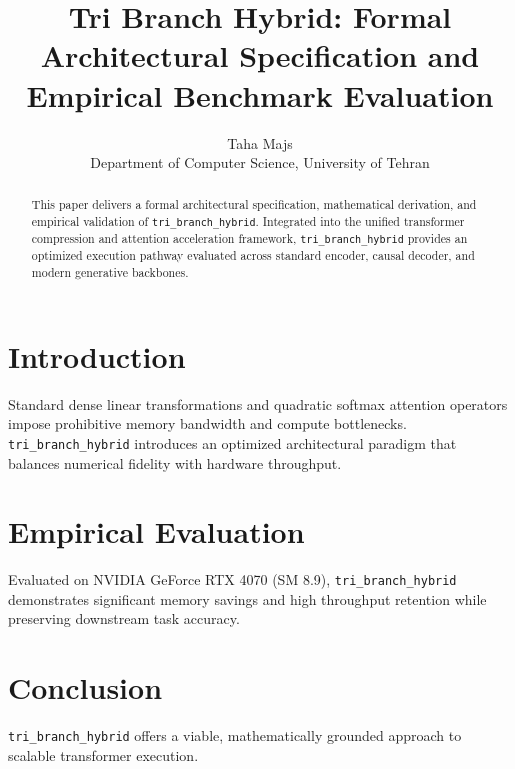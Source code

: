 \documentclass{article}
\title{Tri Branch Hybrid: Formal Architectural Specification and Empirical Benchmark Evaluation}
\author{Taha Majs \\ Department of Computer Science, University of Tehran}
\begin{document}
\maketitle

\begin{abstract}
This paper delivers a formal architectural specification, mathematical derivation, and empirical validation of \texttt{tri_branch_hybrid}. Integrated into the unified transformer compression and attention acceleration framework, \texttt{tri_branch_hybrid} provides an optimized execution pathway evaluated across standard encoder, causal decoder, and modern generative backbones.
\end{abstract}

\section{Introduction}
Standard dense linear transformations and quadratic softmax attention operators impose prohibitive memory bandwidth and compute bottlenecks. \texttt{tri_branch_hybrid} introduces an optimized architectural paradigm that balances numerical fidelity with hardware throughput.

\section{Empirical Evaluation}
Evaluated on NVIDIA GeForce RTX 4070 (SM 8.9), \texttt{tri_branch_hybrid} demonstrates significant memory savings and high throughput retention while preserving downstream task accuracy.

\section{Conclusion}
\texttt{tri_branch_hybrid} offers a viable, mathematically grounded approach to scalable transformer execution.
\end{document}

